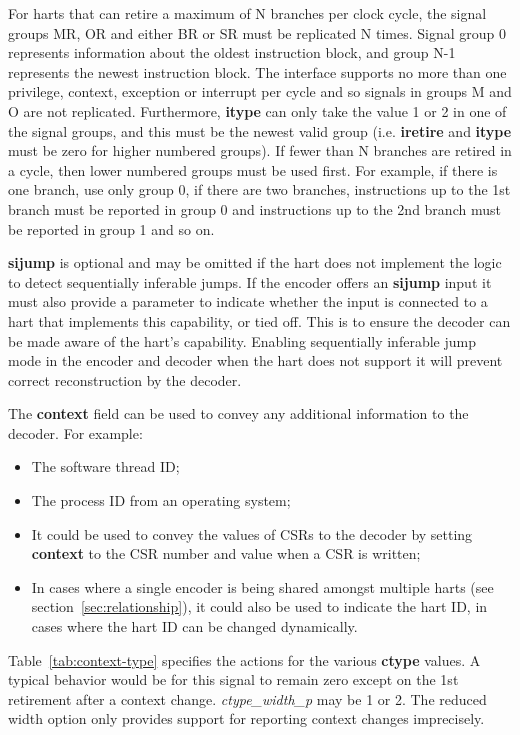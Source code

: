 For harts that can retire a maximum of N branches per clock
cycle, the signal groups MR, OR and either BR or SR must be replicated N times. 
Signal group 0 represents information about the oldest instruction block, and group N-1
represents the newest instruction block. The interface supports no more
than one privilege, context, exception or interrupt per cycle and so signals in
groups M and O are not replicated. Furthermore, \textbf{itype} can only
take the value 1 or 2 in one of the signal groups, and this must be
the newest valid group (i.e. \textbf{iretire} and \textbf{itype} must
be zero for higher numbered groups). If fewer than N branches
are retired in a cycle, then lower numbered groups must be used
first. For example, if there is one branch, use only group 0, if
there are two branches, instructions up to the 1st branch
must be reported in group 0 and instructions up to the 2nd branch
must be reported in group 1 and so on.

\textbf{sijump} is optional and may be omitted if the hart does not implement the logic to detect
sequentially inferable jumps.  If the encoder offers an \textbf{sijump} input it must also provide a
parameter to indicate whether the input is connected to a hart that implements this capability, or
tied off.  This is to ensure the decoder can be made aware of the hart's capability.  Enabling 
sequentially inferable jump mode in the encoder and decoder when the hart does not support it will
prevent correct reconstruction by the decoder. 

The \textbf{context} field can be used to convey any additional information to the decoder.  For example:

\begin{itemize}
  \item The software thread ID;
  \item The process ID from an operating system;
  \item It could be used to convey the values of CSRs to the decoder by setting \textbf{context} to the 
    CSR number and value when a CSR is written;
  \item In cases where a single encoder is being shared amongst multiple harts 
  (see section~\ref{sec:relationship}), it could also be used to indicate the hart ID, in cases where the 
  hart ID can be changed dynamically.
\end{itemize}

Table~\ref{tab:context-type} specifies the actions for the various \textbf{ctype} values.  A typical 
behavior would be for this signal to remain zero except on the 1st retirement after a context change.
\textit{ctype\_width\_p} may be 1 or 2.  The reduced width option only provides support for reporting
context changes imprecisely.

